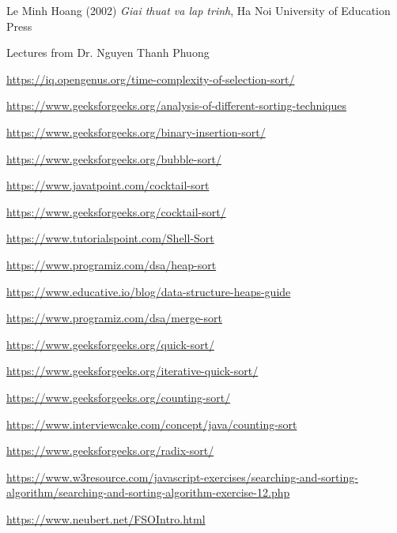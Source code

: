 \documentclass[12pt,a4paper]{article}
\begin{document}
\newpage
\begin{thebibliography}{9}
Le Minh Hoang (2002) \emph{Giai thuat va lap trinh}, Ha Noi University of Education Press

Lectures from Dr. Nguyen Thanh Phuong

\url{https://iq.opengenus.org/time-complexity-of-selection-sort/}

\url{https://www.geeksforgeeks.org/analysis-of-different-sorting-techniques}

\url{https://www.geeksforgeeks.org/binary-insertion-sort/}

\url{https://www.geeksforgeeks.org/bubble-sort/}

\url{https://www.javatpoint.com/cocktail-sort}

\url{https://www.geeksforgeeks.org/cocktail-sort/}

\url{https://www.tutorialspoint.com/Shell-Sort}

\url{https://www.programiz.com/dsa/heap-sort}

\url{https://www.educative.io/blog/data-structure-heaps-guide}

\url{https://www.programiz.com/dsa/merge-sort}

\url{https://www.geeksforgeeks.org/quick-sort/}

\url{https://www.geeksforgeeks.org/iterative-quick-sort/}

\url{https://www.geeksforgeeks.org/counting-sort/}

\url{https://www.interviewcake.com/concept/java/counting-sort}

\url{https://www.geeksforgeeks.org/radix-sort/}

\url{https://www.w3resource.com/javascript-exercises/searching-and-sorting-algorithm/searching-and-sorting-algorithm-exercise-12.php}

\url{https://www.neubert.net/FSOIntro.html}

\end{thebibliography}
\end{document}
